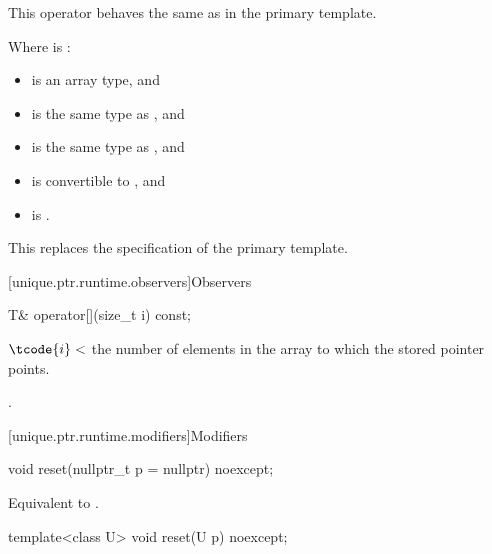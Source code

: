\begin{itemdescr}
\pnum
This operator behaves the same as in the primary template.

\pnum
\constraints
Where  is :
\begin{itemize}
\item {} is an array type, and
\item {} is the same type as , and
\item {} is the same type as , and
\item {} is convertible to , and
\item {} is .
\end{itemize}

\begin{note}
This replaces the \constraints specification of the primary template.
\end{note}
\end{itemdescr}

[unique.ptr.runtime.observers]{Observers}

%
\begin{itemdecl}
T& operator[](size_t i) const;
\end{itemdecl}

\begin{itemdescr}
\pnum
\expects
$\tcode{i} <$ the
number of elements in the array to which
the stored pointer points.

\pnum
\returns
{}.
\end{itemdescr}

[unique.ptr.runtime.modifiers]{Modifiers}

%
\begin{itemdecl}
void reset(nullptr_t p = nullptr) noexcept;
\end{itemdecl}

\begin{itemdescr}
\pnum
\effects
Equivalent to .
\end{itemdescr}

%
\begin{itemdecl}
template<class U> void reset(U p) noexcept;
\end{itemdecl}

